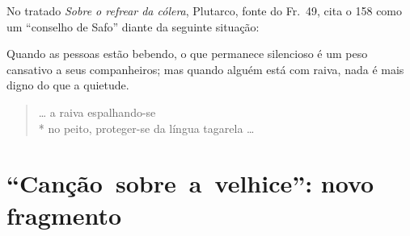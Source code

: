 {{\small No tratado \textit{Sobre o refrear da cólera}, Plutarco, fonte do Fr.~49, cita o
158 como um ``conselho de Safo” diante da seguinte situação:

\begin{hedraquote}
Quando as pessoas estão bebendo, o que permanece silencioso é um peso
cansativo a seus companheiros; mas quando alguém está com raiva, nada é mais
digno do que a quietude.
\end{hedraquote}}

\begin{verse}
\ldots{} a raiva espalhando-se \\*
no peito, proteger-se da língua tagarela \ldots{}
\end{verse}

\chapter{\mbox{“Canção sobre a velhice”:} novo fragmento}

}
